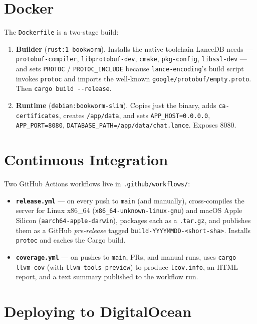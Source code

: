 \section{Docker}

The \verb|Dockerfile| is a two-stage build:

\begin{enumerate}
  \item \textbf{Builder} (\verb|rust:1-bookworm|). Installs the native toolchain
        LanceDB needs --- \verb|protobuf-compiler|, \verb|libprotobuf-dev|,
        \verb|cmake|, \verb|pkg-config|, \verb|libssl-dev| --- and sets
        \verb|PROTOC| / \verb|PROTOC_INCLUDE| because \verb|lance-encoding|'s
        build script invokes \verb|protoc| and imports the well-known
        \verb|google/protobuf/empty.proto|. Then \verb|cargo build --release|.
  \item \textbf{Runtime} (\verb|debian:bookworm-slim|). Copies just the binary,
        adds \verb|ca-certificates|, creates \verb|/app/data|, and sets
        \verb|APP_HOST=0.0.0.0|, \verb|APP_PORT=8080|,
        \verb|DATABASE_PATH=/app/data/chat.lance|. Exposes 8080.
\end{enumerate}

\section{Continuous Integration}

Two GitHub Actions workflows live in \verb|.github/workflows/|:

\begin{itemize}
  \item \textbf{\texttt{release.yml}} --- on every push to \verb|main| (and
        manually), cross-compiles the server for Linux x86\_64
        (\verb|x86_64-unknown-linux-gnu|) and macOS Apple Silicon
        (\verb|aarch64-apple-darwin|), packages each as a \verb|.tar.gz|, and
        publishes them as a GitHub \emph{pre-release} tagged
        \verb|build-YYYYMMDD-<short-sha>|. Installs \verb|protoc| and caches the
        Cargo build.
  \item \textbf{\texttt{coverage.yml}} --- on pushes to \verb|main|, PRs, and
        manual runs, uses \verb|cargo llvm-cov| (with
        \verb|llvm-tools-preview|) to produce \verb|lcov.info|, an HTML report,
        and a text summary published to the workflow run.
\end{itemize}

\section{Deploying to DigitalOcean}

